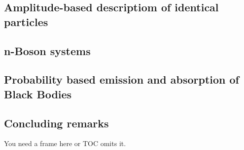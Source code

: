 \documentclass[aspectratio=169]{beamer}
\begin{document}
\subsection{Amplitude-based descriptiom of identical particles}

\subsection{n-Boson systems}

\subsection{Probability based emission and absorption of Black Bodies}

\subsection{Concluding remarks}
\begin{frame}
	You need a frame here or TOC omits it.
\end{frame}
\end{document}
